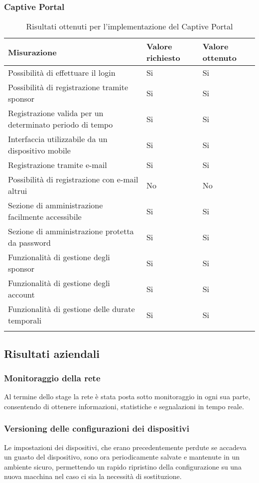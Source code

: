 \documentclass[Tesi.tex]{subfiles}
\begin{document}
\subsubsection{Captive Portal}
\label{table:Risultati ottenuti per l'implementazione del Captive Portal}
\renewcommand*{\arraystretch}{1.2}
\begin{longtable}[H]{p{9.5cm}p{3.2cm}p{2cm}}
	\rowcolor{CHeader}
	\color{CHeaderText} \textbf{Misurazione} & \color{CHeaderText} \textbf{Valore richiesto}& \color{CHeaderText} \textbf{Valore ottenuto}  \\
	\endhead
	Possibilità di effettuare il login &
	Si & Si \\
	Possibilità di registrazione tramite sponsor &
	Si & Si \\
	Registrazione valida per un determinato periodo di tempo &
	Si & Si \\
	Interfaccia utilizzabile da un dispositivo mobile &
	Si & Si \\
	Registrazione tramite e-mail &
	Si & Si \\
	Possibilità di registrazione con e-mail altrui &
	No & No \\
	Sezione di amministrazione facilmente accessibile &
	Si & Si \\
	Sezione di amministrazione protetta da password &
	Si & Si \\
	Funzionalità di gestione degli sponsor &
	Si & Si \\
	Funzionalità di gestione degli account &
	Si & Si \\
	Funzionalità di gestione delle durate temporali &
	Si & Si \\
	
	\hiderowcolors
	\caption{Risultati ottenuti per l'implementazione del Captive Portal}
\end{longtable}

\newpage
\subsection{Risultati aziendali}
\subsubsection{Monitoraggio della rete}
Al termine dello stage la rete è stata posta sotto monitoraggio in ogni sua parte, consentendo di ottenere informazioni, statistiche e segnalazioni in tempo reale.

\subsubsection{Versioning delle configurazioni dei dispositivi}
Le impostazioni dei dispositivi, che erano precedentemente perdute se accadeva un guasto del dispositivo, sono ora periodicamente salvate e mantenute in un ambiente sicuro, permettendo un rapido ripristino della configurazione su una nuova macchina nel caso ci sia la necessità di sostituzione.
\end{document}
